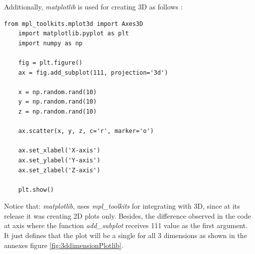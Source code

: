 \documentclass[12pt,a4paper, oneside]{book}
\begin{document}
Additionally, \textit{matplotlib} is used for creating 3D as follows : 
\begin{lstlisting}[style=stylejupyter]
	from mpl_toolkits.mplot3d import Axes3D
	import matplotlib.pyplot as plt
	import numpy as np
	
	fig = plt.figure()
	ax = fig.add_subplot(111, projection='3d')
	
	x = np.random.rand(10)
	y = np.random.rand(10)
	z = np.random.rand(10)
	
	ax.scatter(x, y, z, c='r', marker='o')
	
	ax.set_xlabel('X-axis')
	ax.set_ylabel('Y-axis')
	ax.set_zlabel('Z-axis')
	
	plt.show()
\end{lstlisting} 
Notice that: \textit{matplotlib}, uses \textit{mpl\_toolkits} for integrating with 3D, since at its release it was creating 2D plots only. 
Besides, the difference observed in the code at axis where the function \textit{add\_subplot} receives 111 value as the first argument. It just defines that the plot will be a single for all 3 dimensions as shown in the annexes figure \ref{fig:3ddimensionPlotlib}. 
\end{document}
